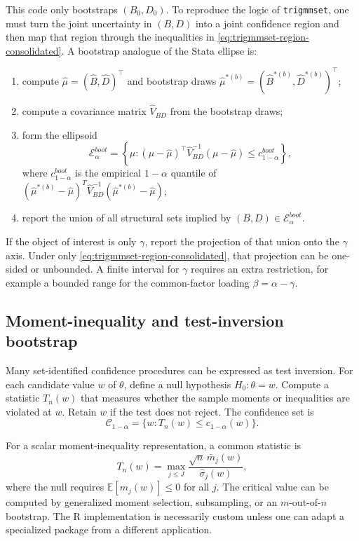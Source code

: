 \documentclass[11pt]{article}
\newcommand{\E}{\mathbb{E}}
\newcommand{\T}{\top}
\theoremstyle{plain}
\theoremstyle{definition}
\theoremstyle{remark}
\begin{document}
This code only bootstraps $(B_0,D_0)$.  To reproduce the logic of
\texttt{trigmmset}, one must turn the joint uncertainty in $(B,D)$ into a joint
confidence region and then map that region through the inequalities in
\eqref{eq:trigmmset-region-consolidated}.  A bootstrap analogue of the Stata
ellipse is:
\begin{enumerate}
    \item compute $\hat\mu=(\hat B,\hat D)^\T$ and bootstrap draws
    $\hat\mu^{*(b)}=(\hat B^{*(b)},\hat D^{*(b)})^\T$;
    \item compute a covariance matrix $\hat V_{BD}$ from the bootstrap draws;
    \item form the ellipsoid
    \begin{equation}
    \mathcal E_{\alpha}^{boot}=
    \left\{\mu:
    (\mu-\hat\mu)^\T\hat V_{BD}^{-1}(\mu-\hat\mu)
    \le c_{1-\alpha}^{boot}
    \right\},
    \end{equation}
    where $c_{1-\alpha}^{boot}$ is the empirical $1-\alpha$ quantile of
    $(\hat\mu^{*(b)}-\hat\mu)^T\hat V_{BD}^{-1}
    (\hat\mu^{*(b)}-\hat\mu)$;
    \item report the union of all structural sets implied by
    $(B,D)\in\mathcal E_{\alpha}^{boot}$.
\end{enumerate}

If the object of interest is only $\gamma$, report the projection of that union
onto the $\gamma$ axis.  Under only \eqref{eq:trigmmset-region-consolidated},
that projection can be one-sided or unbounded.  A finite interval for $\gamma$
requires an extra restriction, for example a bounded range for the common-factor
loading $\beta=\alpha-\gamma$.

\subsection{Moment-inequality and test-inversion bootstrap}
\label{subsec:moment-ineq-bootstrap}

Many set-identified confidence procedures can be expressed as test inversion.
For each candidate value $w$ of $\theta$, define a null hypothesis
$H_0:\theta=w$.  Compute a statistic $T_n(w)$ that measures whether the sample
moments or inequalities are violated at $w$.  Retain $w$ if the test does not
reject.  The confidence set is
\begin{equation}
\mathcal C_{1-\alpha}=\{w:T_n(w)\le c_{1-\alpha}(w)\}.
\end{equation}

For a scalar moment-inequality representation, a common statistic is
\begin{equation}
T_n(w)=\max_{j\le J}
\frac{\sqrt n\,\bar m_j(w)}{\hat\sigma_j(w)},
\end{equation}
where the null requires $\E[m_j(w)]\le0$ for all $j$.  The critical value can be
computed by generalized moment selection, subsampling, or an $m$-out-of-$n$
bootstrap.  The R implementation is necessarily custom unless one can adapt a
specialized package from a different application.
\end{document}
